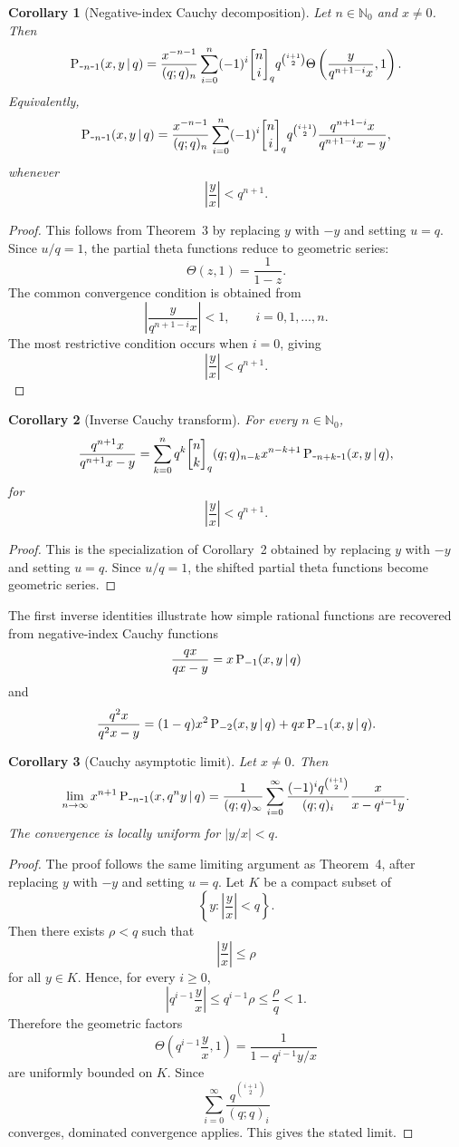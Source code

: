 \documentclass[12pt]{article}
\newcommand{\qbinom}{\genfrac{[}{]}{0pt}{}}
\newcommand{\minus}{\textup{\texttt{-}}}
\def\P{\mathop{\mbox{\textup{P}}}\nolimits}
\newtheorem{corollary}{Corollary}
\begin{document}
\begin{corollary}[Negative-index Cauchy decomposition] 
Let \(n\in\mathbb N_0\) and \(x\neq 0\). Then 
\[ 
\P_{\minus n\minus1}(x,y\,|\,q) = \frac{x^{-n-1}}{(q;q)_n} \sum_{i=0}^{n} (-1)^i \qbinom{n}{i}_{q} q^{\binom{i+1}{2}} \Theta\left( \frac{y}{q^{n+1-i}x},1 \right). 
\] 
Equivalently, 
\[ 
\P_{\minus n\minus1}(x,y\,|\,q) = \frac{x^{-n-1}}{(q;q)_n} \sum_{i=0}^{n} (-1)^i \qbinom{n}{i}_{q} q^{\binom{i+1}{2}} \frac{q^{n+1-i}x}{q^{n+1-i}x-y}, 
\] 
whenever 
\[ 
\left|\frac{y}{x}\right|<q^{n+1}. 
\]
\end{corollary}
\begin{proof} 
This follows from Theorem~3 by replacing \(y\) with \(-y\) and setting \(u=q\). Since \(u/q=1\), the partial theta functions reduce to geometric series: \[ \Theta(z,1)=\frac{1}{1-z}. \] The common convergence condition is obtained from \[ \left| \frac{y}{q^{n+1-i}x} \right|<1, \qquad i=0,1,\ldots,n. \] The most restrictive condition occurs when \(i=0\), giving \[ \left|\frac{y}{x}\right|<q^{n+1}. \] 
\end{proof}

\begin{corollary}[Inverse Cauchy transform] 
For every \(n\in\mathbb N_0\), 
\[ 
\frac{q^{n+1}x}{q^{n+1}x-y} = \sum_{k=0}^{n} q^k\qbinom{n}{k}_q(q;q)_{n-k} x^{n-k+1}\P_{\minus n+k\minus1}(x,y\,|\,q), 
\] 
for 
\[ 
\left|\frac{y}{x}\right|<q^{n+1}. 
\] 
\end{corollary}
\begin{proof} 
This is the specialization of Corollary~2 obtained by replacing \(y\) with \(-y\) and setting \(u=q\). Since \(u/q=1\), the shifted partial theta functions become geometric series. 
\end{proof}

The first inverse identities illustrate how simple rational functions are recovered from negative-index Cauchy functions
\[ 
\frac{qx}{qx-y} = x\P_{-1}(x,y\,|\,q)
\] 
and 
\[ 
\frac{q^2x}{q^2x-y} = (1-q)x^2\P_{-2}(x,y\,|\,q) + qx\P_{-1}(x,y\,|\,q). 
\]
\begin{corollary}[Cauchy asymptotic limit] 
Let \(x\neq0\). Then 
\[ 
\lim_{n\to\infty} x^{n+1}\P_{\minus n\minus1}(x,q^ny\,|\,q) = \frac{1}{(q;q)_\infty} \sum_{i=0}^{\infty} \frac{(-1)^i q^{\binom{i+1}{2}}}{(q;q)_i} \frac{x}{x-q^{i-1}y}. 
\] 
The convergence is locally uniform for \(\left|y/x\right|<q\). 
\end{corollary}
\begin{proof} 
The proof follows the same limiting argument as Theorem~4, after replacing \(y\) with \(-y\) and setting \(u=q\). Let \(K\) be a compact subset of 
\[ 
\left\{ y:\left|\frac{y}{x}\right|<q \right\}. 
\] 
Then there exists \(\rho<q\) such that 
\[ 
\left|\frac{y}{x}\right|\leq \rho 
\] 
for all \(y\in K\). Hence, for every \(i\geq0\), 
\[ 
\left|q^{i-1}\frac{y}{x}\right| \leq q^{i-1}\rho \leq \frac{\rho}{q}<1. 
\] 
Therefore the geometric factors 
\[ 
\Theta\left(q^{i-1}\frac{y}{x},1\right) = \frac{1}{1-q^{i-1}y/x} 
\] 
are uniformly bounded on \(K\). Since 
\[ 
\sum_{i=0}^{\infty} \frac{q^{\binom{i+1}{2}}}{(q;q)_i} 
\] 
converges, dominated convergence applies. This gives the stated limit. 
\end{proof}
\end{document}
